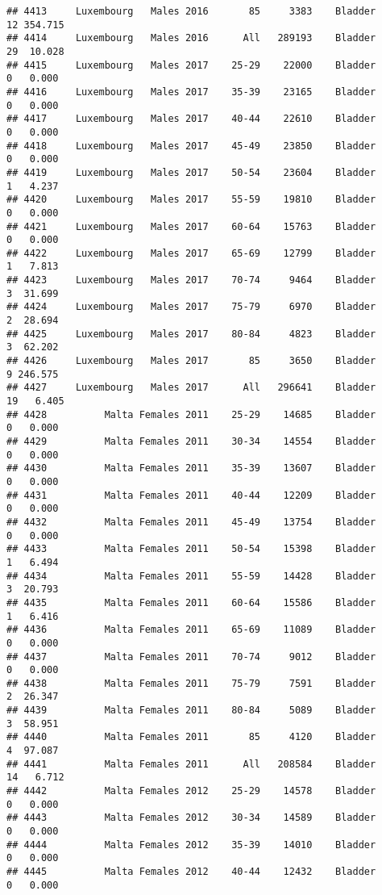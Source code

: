 \documentclass[
]{article}
\begin{document}
\begin{verbatim}
## 4413     Luxembourg   Males 2016       85     3383    Bladder     12 354.715
## 4414     Luxembourg   Males 2016      All   289193    Bladder     29  10.028
## 4415     Luxembourg   Males 2017    25-29    22000    Bladder      0   0.000
## 4416     Luxembourg   Males 2017    35-39    23165    Bladder      0   0.000
## 4417     Luxembourg   Males 2017    40-44    22610    Bladder      0   0.000
## 4418     Luxembourg   Males 2017    45-49    23850    Bladder      0   0.000
## 4419     Luxembourg   Males 2017    50-54    23604    Bladder      1   4.237
## 4420     Luxembourg   Males 2017    55-59    19810    Bladder      0   0.000
## 4421     Luxembourg   Males 2017    60-64    15763    Bladder      0   0.000
## 4422     Luxembourg   Males 2017    65-69    12799    Bladder      1   7.813
## 4423     Luxembourg   Males 2017    70-74     9464    Bladder      3  31.699
## 4424     Luxembourg   Males 2017    75-79     6970    Bladder      2  28.694
## 4425     Luxembourg   Males 2017    80-84     4823    Bladder      3  62.202
## 4426     Luxembourg   Males 2017       85     3650    Bladder      9 246.575
## 4427     Luxembourg   Males 2017      All   296641    Bladder     19   6.405
## 4428          Malta Females 2011    25-29    14685    Bladder      0   0.000
## 4429          Malta Females 2011    30-34    14554    Bladder      0   0.000
## 4430          Malta Females 2011    35-39    13607    Bladder      0   0.000
## 4431          Malta Females 2011    40-44    12209    Bladder      0   0.000
## 4432          Malta Females 2011    45-49    13754    Bladder      0   0.000
## 4433          Malta Females 2011    50-54    15398    Bladder      1   6.494
## 4434          Malta Females 2011    55-59    14428    Bladder      3  20.793
## 4435          Malta Females 2011    60-64    15586    Bladder      1   6.416
## 4436          Malta Females 2011    65-69    11089    Bladder      0   0.000
## 4437          Malta Females 2011    70-74     9012    Bladder      0   0.000
## 4438          Malta Females 2011    75-79     7591    Bladder      2  26.347
## 4439          Malta Females 2011    80-84     5089    Bladder      3  58.951
## 4440          Malta Females 2011       85     4120    Bladder      4  97.087
## 4441          Malta Females 2011      All   208584    Bladder     14   6.712
## 4442          Malta Females 2012    25-29    14578    Bladder      0   0.000
## 4443          Malta Females 2012    30-34    14589    Bladder      0   0.000
## 4444          Malta Females 2012    35-39    14010    Bladder      0   0.000
## 4445          Malta Females 2012    40-44    12432    Bladder      0   0.000

\end{verbatim}
\end{document}
